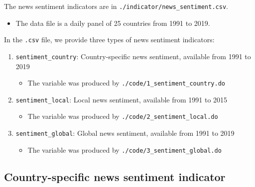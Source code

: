 \documentclass[11pt, fleqn]{article}
\begin{document}
The news sentiment indicators are in \texttt{./indicator/news\_sentiment.csv}. 
\begin{itemize}
\item The data file is a daily panel of 25 countries from 1991 to 2019.
\end{itemize}
In the \texttt{.csv} file, we provide three types of news sentiment indicators:
\begin{enumerate}
\item \texttt{sentiment\_country}: Country-specific news sentiment, available from 1991 to 2019
\begin{itemize}
\item The variable was produced by \texttt{./code/1\_sentiment\_country.do}
\end{itemize}
\item \texttt{sentiment\_local}: Local news sentiment, available from 1991 to 2015
\begin{itemize}
\item The variable was produced by \texttt{./code/2\_sentiment\_local.do}
\end{itemize}
\item \texttt{sentiment\_global}: Global news sentiment, available from 1991 to 2019
\begin{itemize}
\item The variable was produced by \texttt{./code/3\_sentiment\_global.do}
\end{itemize}
\end{enumerate}

%

\subsection{Country-specific news sentiment indicator}
\end{document}
